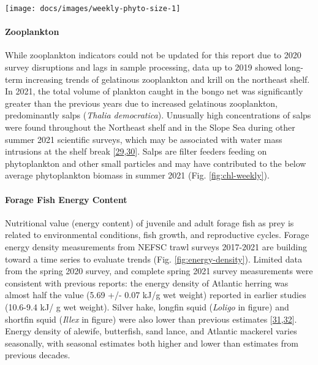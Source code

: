 \documentclass[
  10pt,
]{article}
\let\origfigure\figure
\let\endorigfigure\endfigure
\renewenvironment{figure}[1][2] {
    \expandafter\origfigure\expandafter[H]
} {
    \endorigfigure
}
\begin{document}
\begin{figure}

{\centering \texttt{[image: docs/images/weekly-phyto-size-1]} 

}

\caption{The annual climatology (1998-2020) percent composition of the phytoplankton size classes in the Mid-Atlantic based on satellite observations in the shaded portions.  The 2021 proportions for the microplankton (>20 microns, green) and nanoplankton (2-20 microns, orange) are shown in the bold lines.}\label{fig:weekly-phyto-size}
\end{figure}

\hypertarget{zooplankton}{%
\paragraph{Zooplankton}\label{zooplankton}}

While zooplankton indicators could not be updated for this report due to
2020 survey disruptions and lags in sample processing, data up to 2019
showed long-term increasing trends of gelatinous zooplankton and krill
on the northeast shelf. In 2021, the total volume of plankton caught in
the bongo net was significantly greater than the previous years due to
increased gelatinous zooplankton, predominantly salps (\emph{Thalia
democratica}). Unusually high concentrations of salps were found
throughout the Northeast shelf and in the Slope Sea during other summer
2021 scientific surveys, which may be associated with water mass
intrusions at the shelf break
{[}\protect\hyperlink{ref-madin_periodic_2006}{29},\protect\hyperlink{ref-deibel_predictability_2009}{30}{]}.
Salps are filter feeders feeding on phytoplankton and other small
particles and may have contributed to the below average phytoplankton
biomass in summer 2021 (Fig. \ref{fig:chl-weekly}).

\hypertarget{forage-fish-energy-content}{%
\paragraph{Forage Fish Energy
Content}\label{forage-fish-energy-content}}

Nutritional value (energy content) of juvenile and adult forage fish as
prey is related to environmental conditions, fish growth, and
reproductive cycles. Forage energy density measurements from NEFSC trawl
surveys 2017-2021 are building toward a time series to evaluate trends
(Fig. \ref{fig:energy-density}). Limited data from the spring 2020
survey, and complete spring 2021 survey measurements were consistent
with previous reports: the energy density of Atlantic herring was almost
half the value (5.69 +/- 0.07 kJ/g wet weight) reported in earlier
studies (10.6-9.4 kJ/ g wet weight). Silver hake, longfin squid
(\emph{Loligo} in figure) and shortfin squid (\emph{Illex} in figure)
were also lower than previous estimates
{[}\protect\hyperlink{ref-steimle_energy_1985}{31},\protect\hyperlink{ref-lawson_important_1998}{32}{]}.
Energy density of alewife, butterfish, sand lance, and Atlantic mackerel
varies seasonally, with seasonal estimates both higher and lower than
estimates from previous decades.
\end{document}
